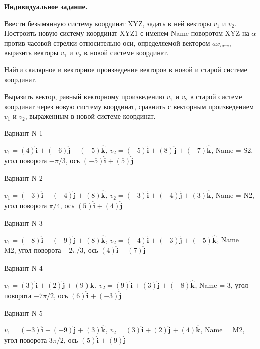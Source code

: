 \documentclass[11pt]{report}
\begin{document}
\pagestyle{empty}

{\bf Индивидуальное задание.}


Ввести безымянную систему координат XYZ, задать в ней векторы $v_1$ и $v_2$. 
Построить новую систему координат XYZ1 с именем Name поворотом  XYZ на $\alpha$ против часовой стрелки относительно оси, 
определяемой вектором $ax_{new}$, выразить векторы $v_1$ и $v_2$ в новой системе координат. 


Найти скалярное и векторное произведение векторов в новой и старой системе координат. 


Выразить вектор, равный векторному произведению $v_1$ и $v_2$ в старой системе координат через новую систему координат, 
сравнить с векторным произведением $v_1$ и $v_2$, выраженным в новой системе координат.

Вариант N 1

$v_1 = (4)\mathbf{\hat{i}_{}} + (-6)\mathbf{\hat{j}_{}} + (-5)\mathbf{\hat{k}_{}}$, $v_2 = (-5)\mathbf{\hat{i}_{}} + (8)\mathbf{\hat{j}_{}} + (-7)\mathbf{\hat{k}_{}}$, Name = S2, угол поворота $- \pi / 3$, ось $(-5)\mathbf{\hat{i}_{}} + (5)\mathbf{\hat{j}_{}}$

Вариант N 2

$v_1 = (-3)\mathbf{\hat{i}_{}} + (-4)\mathbf{\hat{j}_{}} + (8)\mathbf{\hat{k}_{}}$, $v_2 = (-3)\mathbf{\hat{i}_{}} + (-4)\mathbf{\hat{j}_{}} + (3)\mathbf{\hat{k}_{}}$, Name = N2, угол поворота $\pi / 4$, ось $(5)\mathbf{\hat{i}_{}} + (4)\mathbf{\hat{j}_{}}$

Вариант N 3

$v_1 = (-8)\mathbf{\hat{i}_{}} + (-9)\mathbf{\hat{j}_{}} + (8)\mathbf{\hat{k}_{}}$, $v_2 = (-4)\mathbf{\hat{i}_{}} + (-3)\mathbf{\hat{j}_{}} + (-5)\mathbf{\hat{k}_{}}$, Name = M2, угол поворота $- 2 \pi / 3$, ось $(4)\mathbf{\hat{i}_{}} + (7)\mathbf{\hat{j}_{}}$

Вариант N 4

$v_1 = (3)\mathbf{\hat{i}_{}} + (2)\mathbf{\hat{j}_{}} + (9)\mathbf{\hat{k}_{}}$, $v_2 = (9)\mathbf{\hat{i}_{}} + (3)\mathbf{\hat{j}_{}} + (-8)\mathbf{\hat{k}_{}}$, Name = 3, угол поворота $- 7 \pi / 2$, ось $(6)\mathbf{\hat{i}_{}} + (-3)\mathbf{\hat{j}_{}}$

Вариант N 5

$v_1 = (-3)\mathbf{\hat{i}_{}} + (-9)\mathbf{\hat{j}_{}} + (3)\mathbf{\hat{k}_{}}$, $v_2 = (3)\mathbf{\hat{i}_{}} + (2)\mathbf{\hat{j}_{}} + (4)\mathbf{\hat{k}_{}}$, Name = M2, угол поворота $3 \pi / 2$, ось $(5)\mathbf{\hat{i}_{}} + (9)\mathbf{\hat{j}_{}}$
\end{document}
